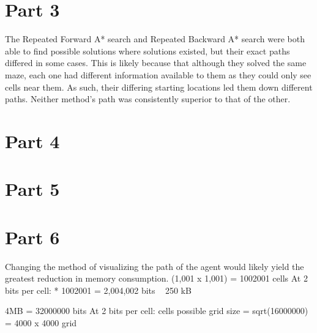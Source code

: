 \documentclass[a4paper,12pt]{article}
\begin{document}
\section{Part 3}
The Repeated Forward A* search and Repeated Backward A* search were both able to find possible solutions where solutions existed, but their exact paths differed in some cases. This is likely because that although they solved the same maze, each one had different information available to them as they could only see cells near them. As such, their differing starting locations led them down different paths. Neither method’s path was consistently superior to that of the other.
\section{Part 4}
\section{Part 5}
\section{Part 6}
Changing the method of visualizing the path of the agent would likely yield the greatest reduction in memory consumption. \newline
(1,001 x 1,001) = 1002001 cells \newline
At 2 bits per cell:  * 1002001  = 2,004,002 bits ~ 250 kB \newline \newline

4MB = 32000000 bits \newline
At 2 bits per cell:  cells possible \newline 
	grid size = sqrt(16000000) = 4000 x 4000 grid
\end{document}
